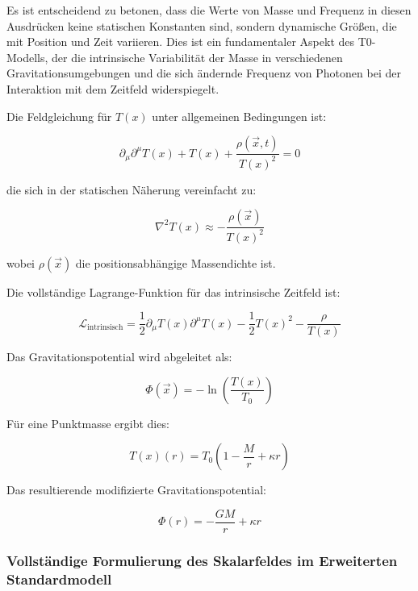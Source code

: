 \documentclass[12pt,a4paper]{article}
\newcommand{\Tfield}{T(x)}
\newcommand{\Tzero}{T_0}
\newcommand{\vecx}{\vec{x}}
\begin{document}
	Es ist entscheidend zu betonen, dass die Werte von Masse und Frequenz in diesen Ausdrücken keine statischen Konstanten sind, sondern dynamische Größen, die mit Position und Zeit variieren. Dies ist ein fundamentaler Aspekt des T0-Modells, der die intrinsische Variabilität der Masse in verschiedenen Gravitationsumgebungen und die sich ändernde Frequenz von Photonen bei der Interaktion mit dem Zeitfeld widerspiegelt.
	
	Die Feldgleichung für \(\Tfield\) unter allgemeinen Bedingungen ist:
	
	\begin{equation}
		\partial_{\mu}\partial^{\mu}\Tfield + \Tfield + \frac{\rho(\vecx,t)}{\Tfield^2} = 0
	\end{equation}
	
	die sich in der statischen Näherung vereinfacht zu:
	
	\begin{equation}
		\nabla^2 \Tfield \approx -\frac{\rho(\vecx)}{\Tfield^2}
	\end{equation}
	
	wobei \(\rho(\vecx)\) die positionsabhängige Massendichte ist.
	
	Die vollständige Lagrange-Funktion für das intrinsische Zeitfeld ist:
	
	\begin{equation}
		\mathcal{L}_{\text{intrinsisch}} = \frac{1}{2}\partial_{\mu}\Tfield\partial^{\mu}\Tfield - \frac{1}{2}\Tfield^2 - \frac{\rho}{\Tfield}
	\end{equation}
	
	Das Gravitationspotential wird abgeleitet als:
	
	\begin{equation}
		\Phi(\vecx) = -\ln\left(\frac{\Tfield}{\Tzero}\right)
	\end{equation}
	
	Für eine Punktmasse ergibt dies:
	
	\begin{equation}
		\Tfield(r) = \Tzero\left(1 - \frac{M}{r} + \kappa r\right)
	\end{equation}
	
	Das resultierende modifizierte Gravitationspotential:
	
	\begin{equation}
		\Phi(r) = -\frac{GM}{r} + \kappa r
	\end{equation}
	
	\subsubsection{Vollständige Formulierung des Skalarfeldes im Erweiterten Standardmodell}
	\label{subsubsec:esm_complete}
	
\end{document}
